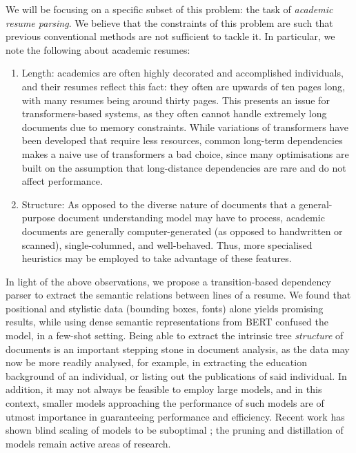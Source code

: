 \documentclass[11pt]{article}
\begin{document}
We will be focusing on a specific subset of this problem: the task of \emph{academic resume parsing}. We believe that the constraints of this problem are such that previous conventional methods are not sufficient to tackle it. In particular, we note the following about academic resumes: 
\begin{enumerate}
	\item Length: academics are often highly decorated and accomplished individuals, and their resumes reflect this fact: they often are upwards of ten pages long, with many resumes being around thirty pages. This presents an issue for transformers-based systems, as they often cannot handle extremely long documents due to memory constraints. While variations of transformers \citep{liu2021swin, peng2021random} have been developed that require less resources, common long-term dependencies makes a naive use of transformers a bad choice, since many optimisations are built on the assumption that long-distance dependencies are rare and do not affect performance. 
	\item Structure: As opposed to the diverse nature of documents that a general-purpose document understanding model may have to process, academic documents are generally computer-generated (as opposed to handwritten or scanned), single-columned, and well-behaved. Thus, more specialised heuristics may be employed to take advantage of these features.
\end{enumerate}
In light of the above observations, we propose a transition-based dependency parser \citep{dozat2018simpler} to extract the semantic relations between lines of a resume. We found that positional and stylistic data (bounding boxes, fonts) alone yields promising results, while using dense semantic representations from BERT \citep{devlin2018bert} confused the model, in a few-shot setting. Being able to extract the intrinsic tree \emph{structure} of documents is an important stepping stone in document analysis, as the data may now be more readily analysed, for example, in extracting the education background of an individual, or listing out the publications of said individual. In addition, it may not always be feasible to employ large models, and in this context, smaller models approaching the performance of such models are of utmost importance in guaranteeing performance and efficiency. Recent work has shown blind scaling of models to be suboptimal \citep{hoffmann2022training}; the pruning and distillation of models \citep{xia2022structured, sanh2019distilbert} remain active areas of research.
\end{document}
